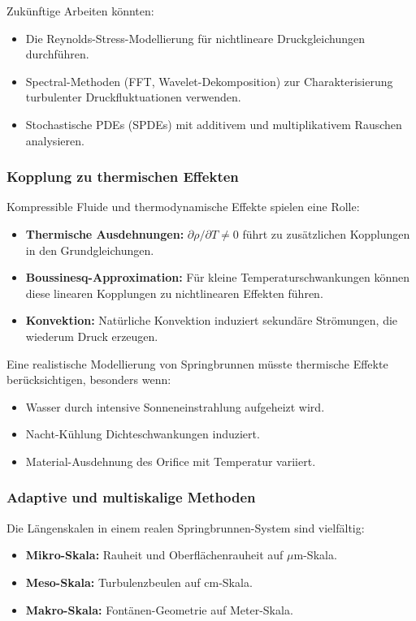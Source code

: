 \documentclass[a4paper,12pt]{article}
\theoremstyle{definition}
\begin{document}
Zukünftige Arbeiten könnten:
\begin{itemize}
	\item Die Reynolds-Stress-Modellierung für nichtlineare Druckgleichungen durchführen.
	\item Spectral-Methoden (FFT, Wavelet-Dekomposition) zur Charakterisierung turbulenter Druckfluktuationen verwenden.
	\item Stochastische PDEs (SPDEs) mit additivem und multiplikativem Rauschen analysieren.
\end{itemize}

\subsubsection{Kopplung zu thermischen Effekten}

Kompressible Fluide und thermodynamische Effekte spielen eine Rolle:

\begin{itemize}
	\item \textbf{Thermische Ausdehnungen:} $\partial \rho / \partial T \neq 0$ führt zu zusätzlichen Kopplungen in den Grundgleichungen.
	\item \textbf{Boussinesq-Approximation:} Für kleine Temperaturschwankungen können diese linearen Kopplungen zu nichtlinearen Effekten führen.
	\item \textbf{Konvektion:} Natürliche Konvektion induziert sekundäre Strömungen, die wiederum Druck erzeugen.
\end{itemize}

Eine realistische Modellierung von Springbrunnen müsste thermische Effekte berücksichtigen, besonders wenn:
\begin{itemize}
	\item Wasser durch intensive Sonneneinstrahlung aufgeheizt wird.
	\item Nacht-Kühlung Dichteschwankungen induziert.
	\item Material-Ausdehnung des Orifice mit Temperatur variiert.
\end{itemize}

\subsubsection{Adaptive und multiskalige Methoden}

Die Längenskalen in einem realen Springbrunnen-System sind vielfältig:

\begin{itemize}
	\item \textbf{Mikro-Skala:} Rauheit und Oberflächenrauheit auf $\mu\text{m}$-Skala.
	\item \textbf{Meso-Skala:} Turbulenzbeulen auf $\text{cm}$-Skala.
	\item \textbf{Makro-Skala:} Fontänen-Geometrie auf Meter-Skala.
\end{itemize}
\end{document}
